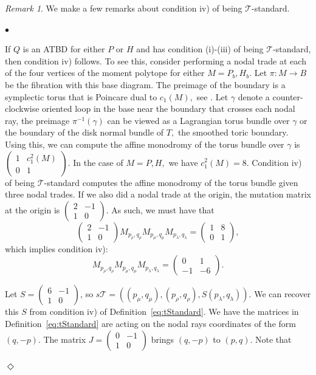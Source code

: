 \documentclass[11pt, reqno]{amsart}
\theoremstyle{remark}
\numberwithin{equation}{subsection}
\numberwithin{figure}{section}
\theoremstyle{customremark}
\newtheorem{rmk_no_diamond}[thm]{Remark}
\newenvironment{rmk}{\begin{rmk_no_diamond} } {\hfill$\er$ \end{rmk_no_diamond}}
\newcommand{\Tt}{\mathcal{T}}
\newenvironment{itemlist}
   { \begin{list} {$\bullet$}
         { \setlength{\topsep}{.5ex}  \setlength{\itemsep}{.5ex} \setlength{\leftmargin}{2.5ex} } }
   { \end{list} }
\newcommand{\la}{{\lambda}}
\newcommand{\er}{{\Diamond}}
\begin{document}
\begin{rmk} \label{rmk:mono}
We make a few remarks about condition iv) of being $\Tt$-standard.
\begin{itemlist}
    \item[{i)}] If $Q$ is an ATBD for either $P$ or $H$ and has condition (i)-(iii) of being $\Tt$-standard, then condition iv) follows. To see this, consider performing a nodal trade at each of the four vertices of the moment polytope for either $M=P_b,H_b$. Let $\pi:M \to B$ be the fibration with this base diagram. The preimage of the boundary is a symplectic torus that is Poincare dual to $c_1(M),$ see \cite[Prop 8.2]{S}. Let $\gamma$ denote a counter-clockwise oriented loop in the base near the boundary that crosses each nodal ray, the preimage $\pi^{-1}(\gamma)$ can be viewed as a Lagrangian torus bundle over $\gamma$ or the boundary of the disk normal bundle of $T,$ the smoothed toric boundary. Using this, we can compute the affine monodromy of the torus bundle over $\gamma$ is $\begin{pmatrix} 1 & c_1^2(M) \\ 0&1 \end{pmatrix}$. In the case of $M=P,H,$ we have $c_1^2(M)=8$. Condition iv) of being $\Tt$-standard computes the affine monodromy of the torus bundle given three nodal trades. If we also did a nodal trade at the origin, the mutation matrix at the origin is $\begin{pmatrix} 2 & -1 \\ 1 & 0 \end{pmatrix}.$ As such, we must have that
    \[\begin{pmatrix} 2 & -1 \\ 1 & 0 \end{pmatrix} M_{p_\rho,q_\rho}M_{p_\mu,q_\mu}M_{p_\la,q_\la}=\begin{pmatrix} 1 & 8 \\ 0 & 1 \end{pmatrix}, \]
    which implies condition iv):
    \[M_{p_\rho,q_\rho}M_{p_\mu,q_\mu}M_{p_\la,q_\la}=\begin{pmatrix} 0 & 1 \\ -1 & -6 \end{pmatrix}.\] 
    \item[{ii)}]   
    Let $S=\begin{pmatrix} 6 & -1 \\ 1 & 0 \end{pmatrix}$, so $s\Tt=((p_\mu,q_\mu),(p_\rho,q_\rho),S(p_\la,q_\la)).$ We can recover this $S$ from condition iv) of Definition~\ref{eq:tStandard}. We have the matrices in Definition~\ref{eq:tStandard} are acting on the nodal rays coordinates of the form $(q,-p).$ The matrix $J=\begin{pmatrix} 0 & -1 \\ 1 & 0 \end{pmatrix}$ brings $(q,-p)$ to $(p,q).$ Note that 

\end{itemlist}
\end{rmk}
\end{document}
